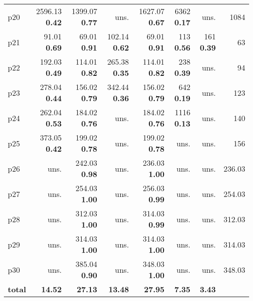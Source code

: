 \begin{tabular}{lrrrrrrr}
\multicolumn{1}{l|}{p20} & {\footnotesize 2596.13} \textbf{0.42} & {\footnotesize 1399.07} \textbf{0.77} & uns. & {\footnotesize 1627.07} \textbf{0.67} & {\footnotesize 6362} \textbf{0.17} & uns. & \multicolumn{1}{|r}{1084}\\
\multicolumn{1}{l|}{p21} & {\footnotesize 91.01} \textbf{0.69} & {\footnotesize 69.01} \textbf{0.91} & {\footnotesize 102.14} \textbf{0.62} & {\footnotesize 69.01} \textbf{0.91} & {\footnotesize 113} \textbf{0.56} & {\footnotesize 161} \textbf{0.39} & \multicolumn{1}{|r}{63}\\
\multicolumn{1}{l|}{p22} & {\footnotesize 192.03} \textbf{0.49} & {\footnotesize 114.01} \textbf{0.82} & {\footnotesize 265.38} \textbf{0.35} & {\footnotesize 114.01} \textbf{0.82} & {\footnotesize 238} \textbf{0.39} & uns. & \multicolumn{1}{|r}{94}\\
\multicolumn{1}{l|}{p23} & {\footnotesize 278.04} \textbf{0.44} & {\footnotesize 156.02} \textbf{0.79} & {\footnotesize 342.44} \textbf{0.36} & {\footnotesize 156.02} \textbf{0.79} & {\footnotesize 642} \textbf{0.19} & uns. & \multicolumn{1}{|r}{123}\\
\multicolumn{1}{l|}{p24} & {\footnotesize 262.04} \textbf{0.53} & {\footnotesize 184.02} \textbf{0.76} & uns. & {\footnotesize 184.02} \textbf{0.76} & {\footnotesize 1116} \textbf{0.13} & uns. & \multicolumn{1}{|r}{140}\\
\multicolumn{1}{l|}{p25} & {\footnotesize 373.05} \textbf{0.42} & {\footnotesize 199.02} \textbf{0.78} & uns. & {\footnotesize 199.02} \textbf{0.78} & uns. & uns. & \multicolumn{1}{|r}{156}\\
\multicolumn{1}{l|}{p26} & uns. & {\footnotesize 242.03} \textbf{0.98} & uns. & {\footnotesize 236.03} \textbf{1.00} & uns. & uns. & \multicolumn{1}{|r}{236.03}\\
\multicolumn{1}{l|}{p27} & uns. & {\footnotesize 254.03} \textbf{1.00} & uns. & {\footnotesize 256.03} \textbf{0.99} & uns. & uns. & \multicolumn{1}{|r}{254.03}\\
\multicolumn{1}{l|}{p28} & uns. & {\footnotesize 312.03} \textbf{1.00} & uns. & {\footnotesize 314.03} \textbf{0.99} & uns. & uns. & \multicolumn{1}{|r}{312.03}\\
\multicolumn{1}{l|}{p29} & uns. & {\footnotesize 314.03} \textbf{1.00} & uns. & {\footnotesize 314.03} \textbf{1.00} & uns. & uns. & \multicolumn{1}{|r}{314.03}\\
\multicolumn{1}{l|}{p30} & uns. & {\footnotesize 385.04} \textbf{0.90} & uns. & {\footnotesize 348.03} \textbf{1.00} & uns. & uns. & \multicolumn{1}{|r}{348.03}\\
\midrule
\textbf{total} & \textbf{14.52} & \textbf{27.13} & \textbf{13.48} & \textbf{27.95} & \textbf{7.35} & \textbf{3.43} & \\
\bottomrule
\end{tabular}

